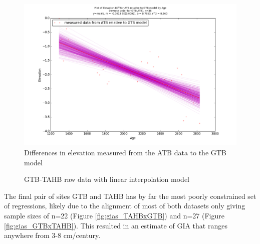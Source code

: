 \begin{figure}[h]
	\includegraphics[width=0.9\linewidth]{data/bothNonZero/withinSeventyFivePercent/gias/theGIA_ATB_relative_to_GTB.png}
	\caption{Differences in elevation measured from the ATB data to the GTB model}
	\label{fig:gias_ATBxGTB}
\end{figure}
\newpage










\begin{figure}[h]
	\caption{GTB-TAHB raw data with linear interpolation model}
	\label{fig:data_GTBxTAHB}
\end{figure}
The final pair of sites GTB and TAHB has by far the most poorly constrained set
of regressions, likely due to the alignment of most of both datasets only giving
sample sizes of n=22 (Figure \ref{fig:gias_TAHBxGTB}) and n=27 (Figure \ref{fig:gias_GTBxTAHB}).
This resulted in an estimate of GIA that ranges anywhere from 3-8 cm/century.
\newpage


